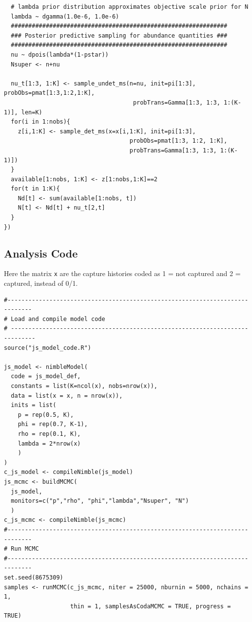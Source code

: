 \documentclass[12pt]{article}
\begin{document}
\begin{verbatim}
  # lambda prior distribution approximates objective scale prior for N
  lambda ~ dgamma(1.0e-6, 1.0e-6)
  ##############################################################
  ### Posterior predictive sampling for abundance quantities ### 
  ##############################################################
  nu ~ dpois(lambda*(1-pstar))
  Nsuper <- n+nu

  nu_t[1:3, 1:K] <- sample_undet_ms(n=nu, init=pi[1:3], probObs=pmat[1:3,1:2,1:K],
                                     probTrans=Gamma[1:3, 1:3, 1:(K-1)], len=K)
  for(i in 1:nobs){
    z[i,1:K] <- sample_det_ms(x=x[i,1:K], init=pi[1:3],
                                    probObs=pmat[1:3, 1:2, 1:K],
                                    probTrans=Gamma[1:3, 1:3, 1:(K-1)])
  }
  available[1:nobs, 1:K] <- z[1:nobs,1:K]==2
  for(t in 1:K){
    Nd[t] <- sum(available[1:nobs, t])
    N[t] <- Nd[t] + nu_t[2,t]
  }
})
\end{verbatim}
\normalsize

\subsection{Analysis Code}

Here the matrix {\tt x} are the capture histories coded as 1 = not captured and 2 = captured, instead of 0/1.
\small
\begin{verbatim}
#-----------------------------------------------------------------------------
# Load and compile model code
# -----------------------------------------------------------------------------
source("js_model_code.R")

js_model <- nimbleModel(
  code = js_model_def,
  constants = list(K=ncol(x), nobs=nrow(x)),
  data = list(x = x, n = nrow(x)),
  inits = list(
    p = rep(0.5, K),
    phi = rep(0.7, K-1),
    rho = rep(0.1, K),
    lambda = 2*nrow(x)
    )
)
c_js_model <- compileNimble(js_model)
js_mcmc <- buildMCMC(
  js_model, 
  monitors=c("p","rho", "phi","lambda","Nsuper", "N") 
  )
c_js_mcmc <- compileNimble(js_mcmc)
#-----------------------------------------------------------------------------
# Run MCMC
#-----------------------------------------------------------------------------
set.seed(8675309)
samples <- runMCMC(c_js_mcmc, niter = 25000, nburnin = 5000, nchains = 1,
                   thin = 1, samplesAsCodaMCMC = TRUE, progress = TRUE)

\end{verbatim}
\normalsize


\clearpage
\end{document}
